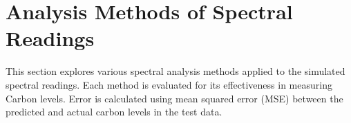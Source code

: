 \section{Analysis Methods of Spectral Readings}

This section explores various spectral analysis methods applied to the simulated spectral readings. Each method is evaluated for its effectiveness in measuring Carbon levels. Error is calculated using mean squared error (MSE) between the predicted and actual carbon levels in the test data.










